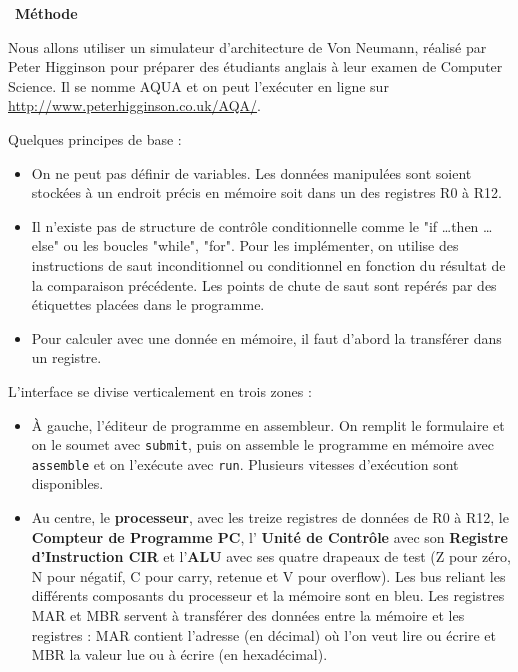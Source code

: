 \documentclass[a4paper, french, 11pt]{article}  %
\newcounter{prog}
\newenvironment{methode}[1]
{\par \medskip    \noindent  
 \begin {bclogo}[arrondi =0.1,logo=\bcoutil, marge=4,noborder = true] {~\textbf{Méthode}   {\itshape #1} }  \par}
{
\end{bclogo}
 \par \bigskip }
\begin{document}
\begin{methode}{}

Nous allons utiliser un simulateur d'architecture de Von Neumann, réalisé par Peter Higginson pour préparer des étudiants anglais à leur examen de Computer Science. Il se nomme AQUA et on peut l'exécuter en ligne sur  \url{http://www.peterhigginson.co.uk/AQA/}. 

Quelques principes de base :

\begin{itemize}
\item On ne peut pas définir de variables. Les données manipulées sont soient stockées à un endroit précis en mémoire soit dans un des registres R0 à R12. 

\item Il n'existe pas de structure de contrôle conditionnelle comme le "if \ldots then \ldots  else" ou les boucles "while", "for". Pour les implémenter, on utilise des instructions de saut inconditionnel ou conditionnel en fonction du résultat de la comparaison précédente. Les points de chute de saut sont repérés par des étiquettes placées dans le programme.

\item Pour calculer avec une donnée en mémoire, il faut d'abord la transférer dans un registre.

\end{itemize}

L'interface se divise verticalement en trois zones :

	\begin{itemize}
	
		\item À gauche, l'éditeur de programme en assembleur. On remplit le formulaire et on le soumet avec \texttt{submit}, puis on assemble le programme en mémoire avec \texttt{assemble} et on l'exécute avec \texttt{run}. Plusieurs vitesses d'exécution sont disponibles.
		
		\item Au centre, le \textbf{processeur}, avec les treize registres de données de R0 à R12, le \textbf{Compteur de Programme PC}, l' \textbf{Unité de Contrôle} avec son \textbf{Registre d'Instruction CIR} et l'\textbf{ALU} avec ses quatre drapeaux de test (Z pour zéro, N pour négatif, C pour carry, retenue et V pour overflow). Les bus reliant les différents composants du processeur et la mémoire sont en bleu. Les registres MAR et MBR servent à transférer des données entre la mémoire et les registres : MAR contient l'adresse (en décimal) où l'on veut lire ou écrire et MBR la valeur lue ou à écrire (en hexadécimal). 
		

\end{itemize}
\end{methode}
\end{document}
